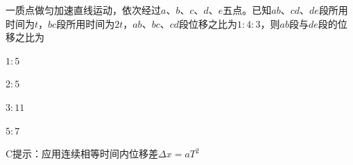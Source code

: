一质点做匀加速直线运动，依次经过\(a\)、\(b\)、\(c\)、\(d\)、\(e\)五点。已知\(ab\)、\(cd\)、\(de\)段所用时间为\(t\)，\(bc\)段所用时间为\(2t\)，\(ab\)、\(bc\)、\(cd\)段位移之比为\(1:4:3\)，则\(ab\)段与\(de\)段的位移之比为\paren[C]
\begin{choices}
	\item \(1:5\)
	\item \(2:5\)
	\item \(3:11\)
	\item \(5:7\)
\end{choices}
\begin{answer}
	C\quad 提示：应用连续相等时间内位移差\(\Delta x = aT^2\)
\end{answer}